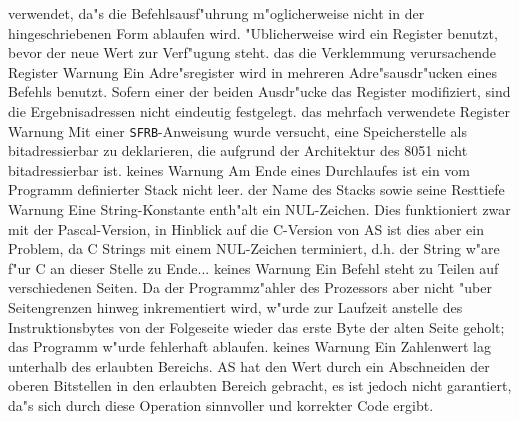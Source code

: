 \documentclass[12pt,a4paper,twoside]{report}
\newcommand{\tty}[1]{{\tt #1}}
\begin{document}
\begin{description}
{                verwendet, da"s die Befehlsausf"uhrung m"oglicherweise nicht
                in der hingeschriebenen Form ablaufen wird.  "Ublicherweise
                wird ein Register benutzt, bevor der neue Wert zur Verf"ugung
                steht.}
               {das die Verklemmung verursachende Register}
               {Warnung}
               {Ein Adre"sregister wird in mehreren
                Adre"sausdr"ucken eines Befehls benutzt.  Sofern einer der
                beiden Ausdr"ucke das Register modifiziert, sind die
                Ergebnisadressen nicht eindeutig festgelegt.}
               {das mehrfach verwendete Register}
               {Warnung}
               {Mit einer \tty{SFRB}-Anweisung wurde
                versucht, eine Speicherstelle als bitadressierbar zu
                deklarieren, die aufgrund der Architektur des 8051 nicht
                bitadressierbar ist.}
               {keines}
               {Warnung}
               {Am Ende eines Durchlaufes ist ein vom
                Programm definierter Stack nicht leer.}
               {der Name des Stacks sowie seine Resttiefe}
	       {Warnung}
	       {Eine String-Konstante enth"alt ein
                NUL-Zeichen. Dies funktioniert zwar mit der Pascal-Version,
                in Hinblick auf die C-Version von AS ist dies aber ein Problem,
                da C Strings mit einem NUL-Zeichen terminiert, d.h. der String
                w"are f"ur C an dieser Stelle zu Ende...}
	       {keines}
	       {Warnung}
	       {Ein Befehl steht zu Teilen auf
                verschiedenen Seiten.  Da der Programmz"ahler des Prozessors
                aber nicht "uber Seitengrenzen hinweg inkrementiert wird,
                w"urde zur Laufzeit anstelle des Instruktionsbytes von der
                Folgeseite wieder das erste Byte der alten Seite geholt; das
                Programm w"urde fehlerhaft ablaufen.}
	       {keines}
               {Warnung}
               {Ein Zahlenwert lag unterhalb des erlaubten Bereichs.  AS
                hat den Wert durch ein Abschneiden der oberen Bitstellen
                in den erlaubten Bereich gebracht, es ist jedoch nicht
                garantiert, da"s sich durch diese Operation sinnvoller und
                korrekter Code ergibt.}

\end{description}
\end{document}
